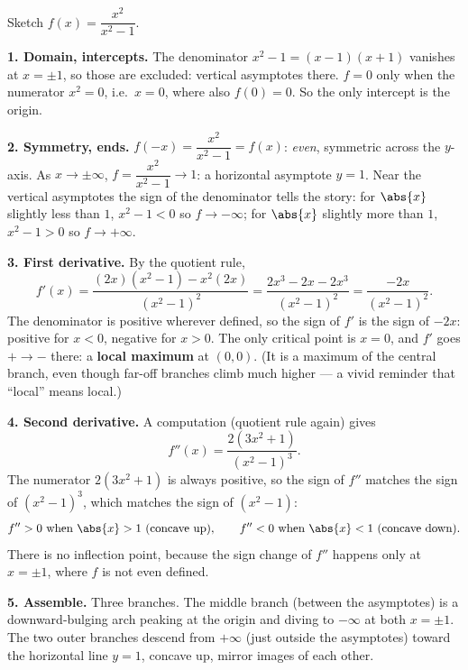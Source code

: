 \begin{example}\label{ch16:ex-sketch-rational}
Sketch $f(x)=\dfrac{x^2}{x^2-1}$.

\smallskip
\textbf{1. Domain, intercepts.} The denominator $x^2-1=(x-1)(x+1)$ vanishes at
$x=\pm1$, so those are excluded: vertical asymptotes there. $f=0$ only when the
numerator $x^2=0$, i.e.\ $x=0$, where also $f(0)=0$. So the only intercept is the
origin.

\textbf{2. Symmetry, ends.} $f(-x)=\dfrac{x^2}{x^2-1}=f(x)$: \emph{even}, symmetric
across the $y$-axis. As $x\to\pm\infty$, $f=\dfrac{x^2}{x^2-1}\to 1$: a horizontal
asymptote $y=1$. Near the vertical asymptotes the sign of the denominator tells the
story: for $\abs{x}$ slightly less than $1$, $x^2-1<0$ so $f\to-\infty$; for
$\abs{x}$ slightly more than $1$, $x^2-1>0$ so $f\to+\infty$.

\textbf{3. First derivative.} By the quotient rule,
\[
f'(x)=\frac{(2x)(x^2-1)-x^2(2x)}{(x^2-1)^2}
=\frac{2x^3-2x-2x^3}{(x^2-1)^2}
=\frac{-2x}{(x^2-1)^2}.
\]
The denominator is positive wherever defined, so the sign of $f'$ is the sign of
$-2x$: positive for $x<0$, negative for $x>0$. The only critical point is $x=0$,
and $f'$ goes $+\to-$ there: a \textbf{local maximum} at $(0,0)$. (It is a maximum
of the central branch, even though far-off branches climb much higher --- a vivid
reminder that ``local'' means local.)

\textbf{4. Second derivative.} A computation (quotient rule again) gives
\[
f''(x)=\frac{2(3x^2+1)}{(x^2-1)^3}.
\]
The numerator $2(3x^2+1)$ is always positive, so the sign of $f''$ matches the sign
of $(x^2-1)^3$, which matches the sign of $(x^2-1)$:
\[
f''>0 \text{ when } \abs{x}>1 \ (\text{concave up}),\qquad
f''<0 \text{ when } \abs{x}<1 \ (\text{concave down}).
\]
There is no inflection point, because the sign change of $f''$ happens only at
$x=\pm1$, where $f$ is not even defined.

\textbf{5. Assemble.} Three branches. The middle branch (between the asymptotes)
is a downward-bulging arch peaking at the origin and diving to $-\infty$ at both
$x=\pm1$. The two outer branches descend from $+\infty$ (just outside the
asymptotes) toward the horizontal line $y=1$, concave up, mirror images of each
other.
\end{example}


